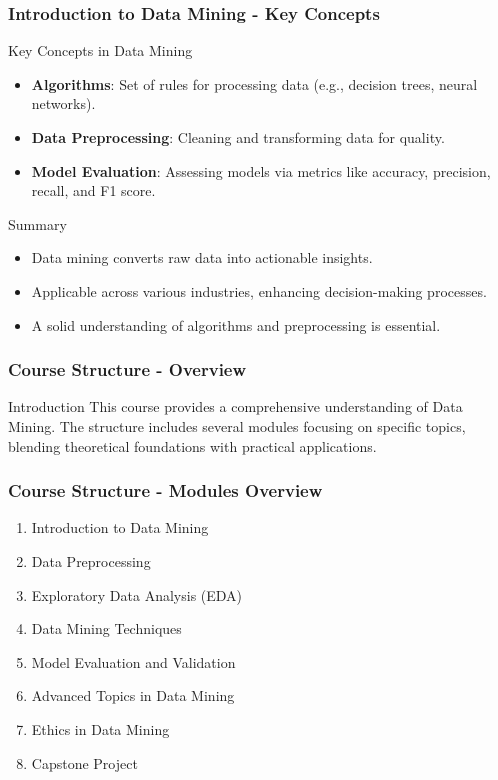 \documentclass[aspectratio=169]{beamer}
\begin{document}
\begin{frame}[fragile]
    \frametitle{Introduction to Data Mining - Key Concepts}
    \begin{block}{Key Concepts in Data Mining}
        \begin{itemize}
            \item \textbf{Algorithms}: Set of rules for processing data (e.g., decision trees, neural networks).
            \item \textbf{Data Preprocessing}: Cleaning and transforming data for quality.
            \item \textbf{Model Evaluation}: Assessing models via metrics like accuracy, precision, recall, and F1 score.
        \end{itemize}
    \end{block}
    \begin{block}{Summary}
        \begin{itemize}
            \item Data mining converts raw data into actionable insights.
            \item Applicable across various industries, enhancing decision-making processes.
            \item A solid understanding of algorithms and preprocessing is essential.
        \end{itemize}
    \end{block}
\end{frame}

\begin{frame}[fragile]
    \frametitle{Course Structure - Overview}
    \begin{block}{Introduction}
        This course provides a comprehensive understanding of Data Mining. 
        The structure includes several modules focusing on specific topics, blending theoretical foundations with practical applications.
    \end{block}
\end{frame}

\begin{frame}[fragile]
    \frametitle{Course Structure - Modules Overview}
    \begin{enumerate}
        \item Introduction to Data Mining
        \item Data Preprocessing
        \item Exploratory Data Analysis (EDA)
        \item Data Mining Techniques
        \item Model Evaluation and Validation
        \item Advanced Topics in Data Mining
        \item Ethics in Data Mining
        \item Capstone Project
    \end{enumerate}
\end{frame}
\end{document}
